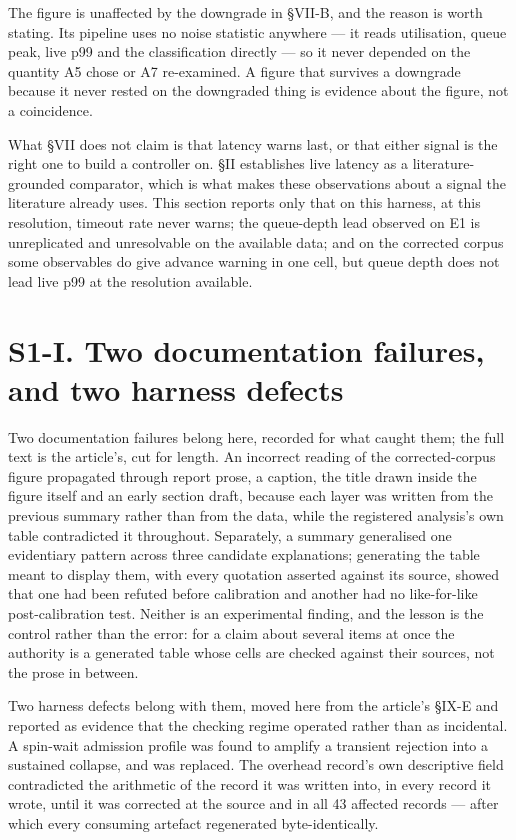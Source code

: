 \documentclass{ieeeaccess}
\begin{document}
The figure is unaffected by the downgrade in \S{}VII-B, and the reason is worth stating. Its pipeline uses no noise statistic anywhere --- it reads utilisation, queue peak, live p99 and the classification directly --- so it never depended on the quantity A5 chose or A7 re-examined. A figure that survives a downgrade because it never rested on the downgraded thing is evidence about the figure, not a coincidence.

What \S{}VII does not claim is that latency warns last, or that either signal is the right one to build a controller on. \S{}II establishes live latency as a literature-grounded comparator, which is what makes these observations about a signal the literature already uses. This section reports only that on this harness, at this resolution, timeout rate never warns; the queue-depth lead observed on E1 is unreplicated and unresolvable on the available data; and on the corrected corpus some observables do give advance warning in one cell, but queue depth does not lead live p99 at the resolution available.

\section*{S1-I. Two documentation failures, and two harness defects}

Two documentation failures belong here, recorded for what caught them; the full text is the article's, cut for length. An incorrect reading of the corrected-corpus figure propagated through report prose, a caption, the title drawn inside the figure itself and an early section draft, because each layer was written from the previous summary rather than from the data, while the registered analysis's own table contradicted it throughout. Separately, a summary generalised one evidentiary pattern across three candidate explanations; generating the table meant to display them, with every quotation asserted against its source, showed that one had been refuted before calibration and another had no like-for-like post-calibration test. Neither is an experimental finding, and the lesson is the control rather than the error: for a claim about several items at once the authority is a generated table whose cells are checked against their sources, not the prose in between.

Two harness defects belong with them, moved here from the article's \S{}IX-E and reported as evidence that the checking regime operated rather than as incidental. A spin-wait admission profile was found to amplify a transient rejection into a sustained collapse, and was replaced. The overhead record's own descriptive field contradicted the arithmetic of the record it was written into, in every record it wrote, until it was corrected at the source and in all 43 affected records --- after which every consuming artefact regenerated byte-identically.


\EOD
\end{document}

